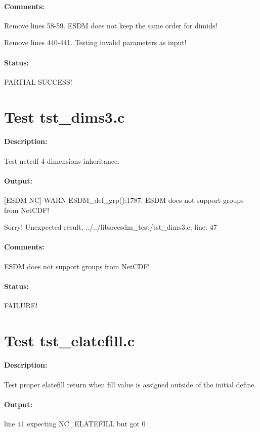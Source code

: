 \paragraph{Comments:} Remove lines 58-59. ESDM does not keep the same order for dimids!

Remove lines 440-441. Testing invalid parameters as input!

\paragraph{Status:} PARTIAL SUCCESS!

\section{Test tst\_dims3.c}

\paragraph{Description:} Test netcdf-4 dimensions inheritance.

\paragraph{Output:} [ESDM NC] WARN ESDM\_def\_grp():1787. ESDM does not support groups from NetCDF!

Sorry! Unexpected result, ../../libsrcesdm\_test/tst\_dims3.c, line: 47

\paragraph{Comments:} ESDM does not support groups from NetCDF!

\paragraph{Status:} FAILURE!

\section{Test tst\_elatefill.c}

\paragraph{Description:} Test proper elatefill return when fill value is assigned outside of the initial define.

\paragraph{Output:} line 41 expecting NC\_ELATEFILL but got 0

